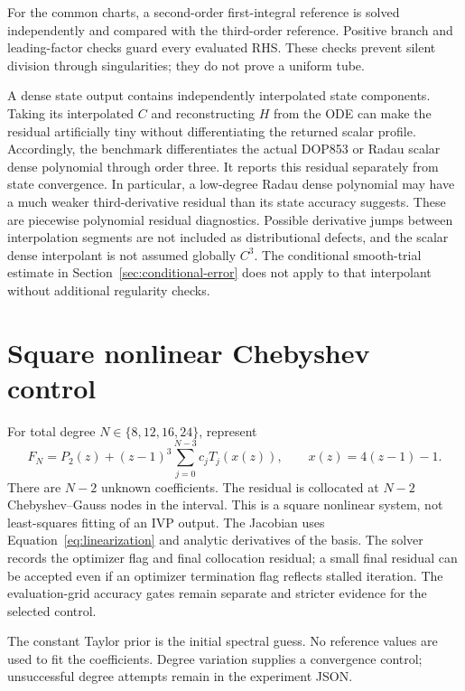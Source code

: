 \documentclass[12pt,a4paper,oneside]{report}
\numberwithin{equation}{chapter}
\begin{document}
For the common charts, a second-order first-integral reference is solved
independently and compared with the third-order reference. Positive branch
and leading-factor checks guard every evaluated RHS. These checks prevent
silent division through singularities; they do not prove a uniform tube.

A dense state output contains independently interpolated state components.
Taking its interpolated $C$ and reconstructing $H$ from the ODE can make the
residual artificially tiny without differentiating the returned scalar
profile. Accordingly, the benchmark differentiates the actual DOP853 or
Radau scalar dense polynomial through order three. It reports this residual
separately from state convergence. In particular, a low-degree Radau dense
polynomial may have a much weaker third-derivative residual than its state
accuracy suggests.
These are piecewise polynomial residual diagnostics. Possible derivative
jumps between interpolation segments are not included as distributional
defects, and the scalar dense interpolant is not assumed globally $C^3$.
The conditional smooth-trial estimate in Section~\ref{sec:conditional-error} does not apply to that
interpolant without additional regularity checks.

\section{Square nonlinear Chebyshev control}
For total degree $N\in\{8,12,16,24\}$, represent
\begin{equation}\label{eq:spectral}
F_N=P_2(z)+(z-1)^3\sum_{j=0}^{N-3}c_jT_j(x(z)),
\qquad x(z)=4(z-1)-1.
\end{equation}
There are $N-2$ unknown coefficients. The residual is collocated at $N-2$
Chebyshev--Gauss nodes in the interval. This is a square nonlinear system,
not least-squares fitting of an IVP output. The Jacobian uses
Equation~\eqref{eq:linearization} and analytic derivatives of the basis.
The solver records the optimizer flag and final collocation residual; a
small final residual can be accepted even if an optimizer termination flag
reflects stalled iteration. The evaluation-grid accuracy gates remain
separate and stricter evidence for the selected control.

The constant Taylor prior is the initial spectral guess. No reference values
are used to fit the coefficients. Degree variation supplies a convergence
control; unsuccessful degree attempts remain in the experiment JSON.
\end{document}

